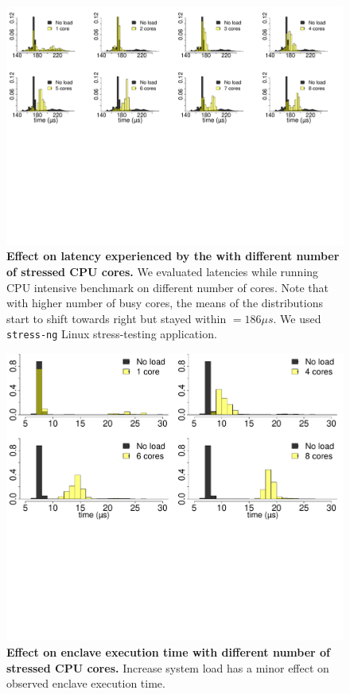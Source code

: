 \begin{figure}[t]
  \centering
    \includegraphics[trim={0 16cm 0 0}, clip, width=\linewidth]{chapters/ProximiTEE/data/CPU_stress/allCore_1.pdf}
    \caption{\textbf{Effect on latency experienced by the \device with different number of stressed CPU cores.} We evaluated latencies while running CPU intensive benchmark on different number of cores. Note that with higher number of busy cores, the means of the  distributions start to shift towards right but stayed within \connect $= 186\mu s$. We used \texttt{stress-ng} Linux stress-testing application.}
    \label{graph:cpuLoad}
\end{figure}

\begin{figure}[t]
  \centering
    \includegraphics[trim={0 12cm 0 0}, clip, width=0.8\linewidth]{chapters/ProximiTEE/data/CPU_stress/allCore_SGX_1.pdf}
    \caption{\textbf{Effect on enclave execution time with different number of stressed CPU cores.} Increase system load has a minor effect on observed enclave execution time.}
    \label{graph:cpuLoad_SGX}
\end{figure}

